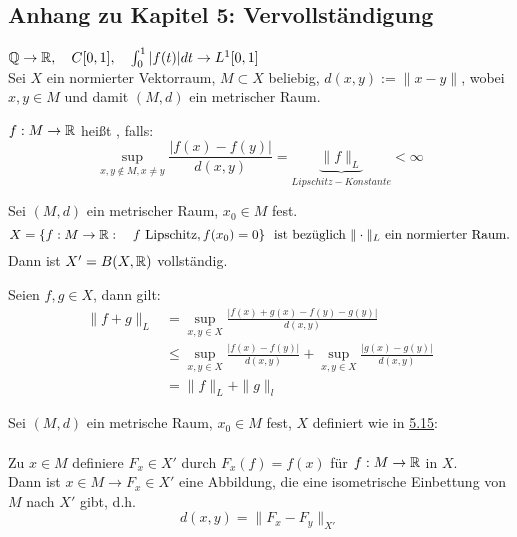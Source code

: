 \subsection*{Anhang zu Kapitel 5: Vervollständigung}

$\mathbb{Q} \rightarrow \mathbb{R}, \quad C[0, 1], \quad \int_{0}^{1} |f(t)| dt \rightarrow L^{1}[0, 1]$ \\
Sei $X$ ein normierter Vektorraum, $M \subset X$ beliebig, $d(x, y) := \| x - y \|$, wobei $x, y \in M$ und damit $(M, d)$ ein metrischer Raum.


\begin{definition} \label{def:5.15-Lipschitz}
	$f: M \rightarrow \mathbb{R}$ hei{\ss}t , falls:
	\[ \sup_{x, y \notin M, x \neq y} \frac{|f(x) - f(y)|}{d(x, y)} = \underbrace{\| f \|_{L}}_{Lipschitz-Konstante} < \infty \]
\end{definition}


\begin{bemerkung}
	Sei $(M, d)$ ein metrischer Raum, $x_{0} \in M$ fest. \\
	\[ X = \{ f: M \rightarrow \MdR: \quad f \text{ Lipschitz}, f(x_{0}) = 0 \} \text{ ist bezüglich } \| \cdot \|_{L} \text{ ein normierter Raum.} \]	
	Dann ist $X' = B(X, \mathbb{R})$ vollständig.
	\begin{beweis}
		Seien $f, g \in X$, dann gilt:  
		\begin{align*}
			\| f + g \|_{L} & = \sup_{x, y \in X} \frac{|f(x) + g(x) - f(y) - g(y)|}{d(x, y)} \\
							& \leq \sup_{x, y \in X} \frac{|f(x) - f(y)|}{d(x, y)} + \sup_{x, y \in X} \frac{|g(x) - g(y)|}{d(x, y)} \\
							& = \| f \|_{L} + \| g \|_{l} 			
		\end{align*} 
	\end{beweis}
\end{bemerkung}


\begin{satz} \label{satz:5-17}
	Sei $(M,d)$ ein metrische Raum, $x_{0} \in M$ fest, $X$ definiert wie in \hyperref[def:5.15-Lipschitz]{5.15}: \\ \\
	Zu $x \in M$ definiere $F_{x} \in X'$ durch $F_{x}(f) = f(x)$ für $f: M \rightarrow \mathbb{R}$ in $X$. \\
	Dann ist $x \in M \rightarrow F_{x} \in X'$ eine Abbildung, die eine isometrische Einbettung von $M$ nach $X'$ gibt, d.h. 
	\[ d(x, y) = \| F_{x} - F_{y} \|_{X'} \]
\end{satz}

